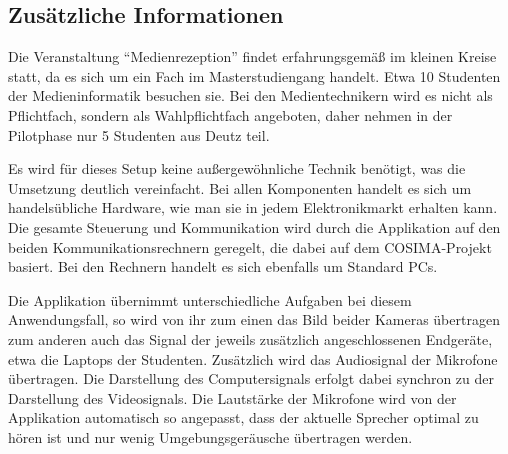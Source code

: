 \subsection{Zusätzliche Informationen} %
\label{sub:zusaetzliche_informationen}

  Die Veranstaltung "`Medienrezeption"' findet erfahrungsgemäß im kleinen Kreise statt, da es sich um ein Fach im Masterstudiengang handelt. Etwa 10 Studenten der Medieninformatik besuchen sie. Bei den Medientechnikern wird es nicht als Pflichtfach, sondern als Wahlpflichtfach angeboten, daher nehmen in der Pilotphase nur 5 Studenten aus Deutz teil.

  Es wird für dieses Setup keine außergewöhnliche Technik benötigt, was die Umsetzung deutlich vereinfacht. Bei allen Komponenten handelt es sich um handelsübliche Hardware, wie man sie in jedem Elektronikmarkt erhalten kann. Die gesamte Steuerung und Kommunikation wird durch die Applikation auf den beiden Kommunikationsrechnern geregelt, die dabei auf dem COSIMA-Projekt basiert. Bei den Rechnern handelt es sich ebenfalls um Standard PCs.

  Die Applikation übernimmt unterschiedliche Aufgaben bei diesem Anwendungsfall, so wird von ihr zum einen das Bild beider Kameras übertragen zum anderen auch das Signal der jeweils zusätzlich angeschlossenen Endgeräte, etwa die Laptops der Studenten. Zusätzlich wird das Audiosignal der Mikrofone übertragen. Die Darstellung des Computersignals erfolgt dabei synchron zu der Darstellung des Videosignals. Die Lautstärke der Mikrofone wird von der Applikation automatisch so angepasst, dass der aktuelle Sprecher optimal zu hören ist und nur wenig Umgebungsgeräusche übertragen werden.



